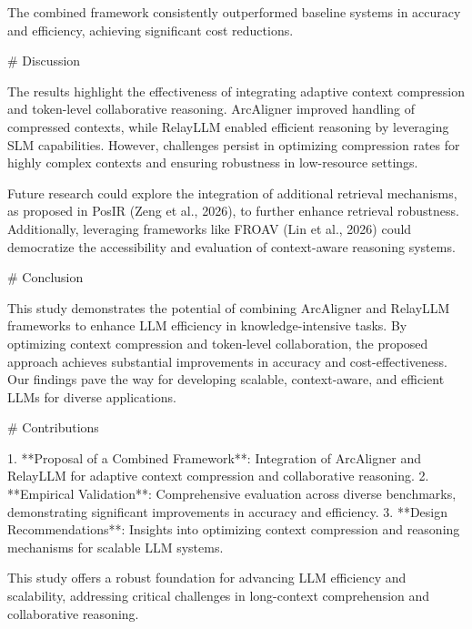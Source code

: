 The combined framework consistently outperformed baseline systems in accuracy and efficiency, achieving significant cost reductions.

# Discussion

The results highlight the effectiveness of integrating adaptive context compression and token-level collaborative reasoning. ArcAligner improved handling of compressed contexts, while RelayLLM enabled efficient reasoning by leveraging SLM capabilities. However, challenges persist in optimizing compression rates for highly complex contexts and ensuring robustness in low-resource settings.

Future research could explore the integration of additional retrieval mechanisms, as proposed in PosIR (Zeng et al., 2026), to further enhance retrieval robustness. Additionally, leveraging frameworks like FROAV (Lin et al., 2026) could democratize the accessibility and evaluation of context-aware reasoning systems.

# Conclusion

This study demonstrates the potential of combining ArcAligner and RelayLLM frameworks to enhance LLM efficiency in knowledge-intensive tasks. By optimizing context compression and token-level collaboration, the proposed approach achieves substantial improvements in accuracy and cost-effectiveness. Our findings pave the way for developing scalable, context-aware, and efficient LLMs for diverse applications.

# Contributions

1. **Proposal of a Combined Framework**: Integration of ArcAligner and RelayLLM for adaptive context compression and collaborative reasoning.
2. **Empirical Validation**: Comprehensive evaluation across diverse benchmarks, demonstrating significant improvements in accuracy and efficiency.
3. **Design Recommendations**: Insights into optimizing context compression and reasoning mechanisms for scalable LLM systems.

This study offers a robust foundation for advancing LLM efficiency and scalability, addressing critical challenges in long-context comprehension and collaborative reasoning.